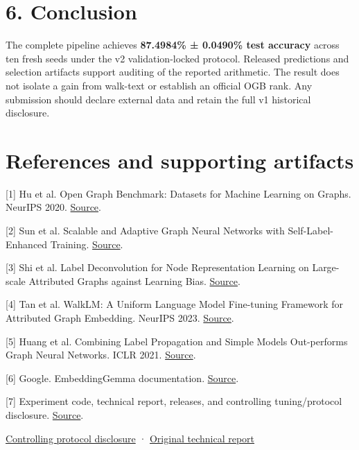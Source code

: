 \documentclass[10pt]{article}
\begin{document}
\section*{6. Conclusion}

The complete pipeline achieves \textbf{87.4984\% ± 0.0490\% test accuracy} across ten fresh seeds under the v2 validation-locked protocol. Released predictions and selection artifacts support auditing of the reported arithmetic. The result does not isolate a gain from walk-text or establish an official OGB rank. Any submission should declare external data and retain the full v1 historical disclosure.\par

\section*{References and supporting artifacts}

{\small [1] Hu et al. Open Graph Benchmark: Datasets for Machine Learning on Graphs. NeurIPS 2020. \href{https://ogb.stanford.edu/}{Source}.\par}

{\small [2] Sun et al. Scalable and Adaptive Graph Neural Networks with Self-Label-Enhanced Training. \href{https://github.com/skepsun/SAGN_with_SLE}{Source}.\par}

{\small [3] Shi et al. Label Deconvolution for Node Representation Learning on Large-scale Attributed Graphs against Learning Bias. \href{https://arxiv.org/abs/2309.14907}{Source}.\par}

{\small [4] Tan et al. WalkLM: A Uniform Language Model Fine-tuning Framework for Attributed Graph Embedding. NeurIPS 2023. \href{https://proceedings.neurips.cc/paper_files/paper/2023/hash/2ac879d1865475a7abc8dfc7a9c15c27-Abstract-Conference.html}{Source}.\par}

{\small [5] Huang et al. Combining Label Propagation and Simple Models Out-performs Graph Neural Networks. ICLR 2021. \href{https://openreview.net/forum?id=8E1-f3VhX1o}{Source}.\par}

{\small [6] Google. EmbeddingGemma documentation. \href{https://ai.google.dev/gemma/docs/embeddinggemma}{Source}.\par}

{\small [7] Experiment code, technical report, releases, and controlling tuning/protocol disclosure. \href{https://github.com/mshanthappa-hub/ld-walklm}{Source}.\par}

{\small \href{https://github.com/mshanthappa-hub/ld-walklm/blob/main/TUNING_AND_PROTOCOL.md}{Controlling protocol disclosure} · \href{https://github.com/mshanthappa-hub/ld-walklm/blob/main/report/technical_report.pdf}{Original technical report}\par}
\end{document}
